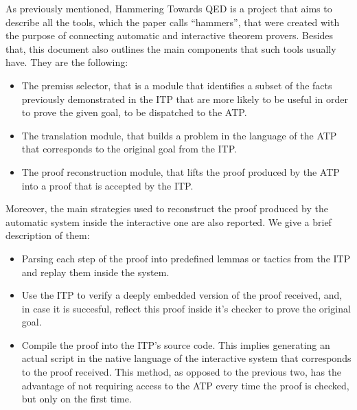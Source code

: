 As previously mentioned, Hammering Towards QED is a project
that aims to describe all the tools, which the paper calls ``hammers'',
that were created with the purpose of connecting automatic and interactive
theorem provers. Besides that, this document also outlines
the main components that such tools usually have. They are
the following:

\begin{itemize}
  \item The premiss selector, that is a module that identifies
        a subset of the facts previously demonstrated in the
        ITP that are more likely to be useful in order to
        prove the given goal, to be dispatched to the ATP.\@
  \item The translation module, that builds a problem in the language of the
        ATP that corresponds to the original goal from the ITP.\@
  \item The proof reconstruction module, that lifts the proof produced
        by the ATP into a proof that is accepted by the ITP.\@
\end{itemize}

Moreover, the main strategies used to reconstruct the proof produced
by the automatic system inside the interactive one are also reported.
We give a brief description of them:

\begin{itemize}
  \item Parsing each step of the proof into predefined lemmas or tactics
        from the ITP and replay them inside the system.
  \item Use the ITP to verify a deeply embedded version of the proof received,
        and, in case it is succesful, reflect this proof inside it's checker
        to prove the original goal.
  \item Compile the proof into the ITP's source code. This implies generating
        an actual script in the native language of the interactive system
        that corresponds to the proof received. This method, as opposed
        to the previous two, has the advantage of not requiring access to
        the ATP every time the proof is checked, but only on the first time.

\end{itemize}


